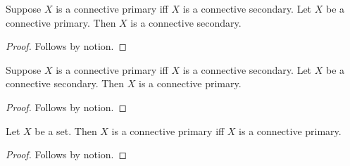 \begin{proposition}\label{horn_connective_iff_forward}
    Suppose $X$ is a connective primary iff $X$ is a connective secondary.
    Let $X$ be a connective primary.
    Then $X$ is a connective secondary.
\end{proposition}
\begin{proof}
    Follows by notion.
\end{proof}

\begin{proposition}\label{horn_connective_iff_backward}
    Suppose $X$ is a connective primary iff $X$ is a connective secondary.
    Let $X$ be a connective secondary.
    Then $X$ is a connective primary.
\end{proposition}
\begin{proof}
    Follows by notion.
\end{proof}

\begin{proposition}\label{horn_connective_iff_scoped}
    Let $X$ be a set.
    Then $X$ is a connective primary iff $X$ is a connective primary.
\end{proposition}
\begin{proof}
    Follows by notion.
\end{proof}
